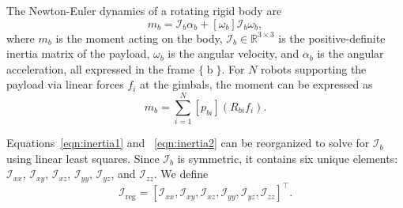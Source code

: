 \documentclass[letterpaper, 10 pt, journal, twoside]{IEEEtran}
\newcommand{\inertia}{{\mathcal{I}}}
\newcommand{\frameb}{\operatorname{b}}
\begin{document}
The Newton-Euler dynamics of a rotating rigid body are 
\begin{equation}
    m_{b} = \mathcal{I}_b \alpha_{b} +[\omega_{b}] \mathcal{I}_b \omega_{b},
    \label{eqn:inertia1}
\end{equation}
where $m_b$ is the moment acting on the body, $\mathcal{I}_b \in \mathbb{R}^{3 \times 3}$ is the positive-definite inertia matrix of the payload, $\omega_b$ is the angular velocity, and $\alpha_b$ is the angular acceleration, all expressed in the frame $\{\frameb\}$. For $N$ robots supporting the payload via linear forces $f_i$ at the gimbals, the moment can be expressed as 
\begin{equation}
    m_{b} = \sum_{i=1}^{N} [p_{bi}] (R_{bi} f_{i}).
    \label{eqn:inertia2}
\end{equation}

Equations~\eqref{eqn:inertia1} and ~\eqref{eqn:inertia2} can be reorganized to solve for $\inertia_b$ using linear least squares. 
Since $\inertia_b$ is symmetric, it contains six unique elements: 
$\inertia_{xx}$, $\inertia_{xy}$, $\inertia_{xz}$, $\inertia_{yy}$, $\inertia_{yz}$, and $\inertia_{zz}$. We define
\begin{equation}
    \inertia_{\operatorname{reg}} = [\inertia_{xx}, \inertia_{xy}, \inertia_{xz}, \inertia_{yy}, \inertia_{yz}, \inertia_{zz}]^\intercal .
\end{equation}
\end{document}
